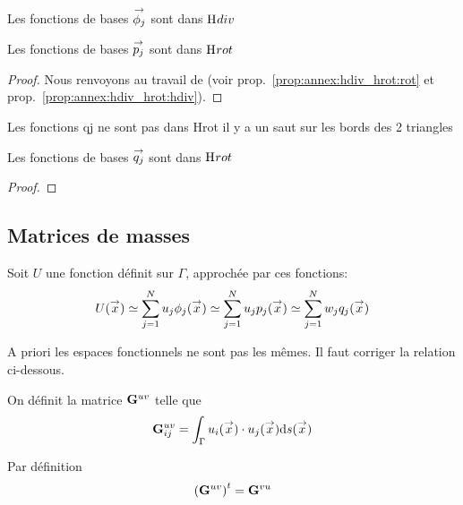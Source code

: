     \begin{prop}
      Les fonctions de bases \({\overset{\rightarrow}{\phi_j}}\) sont dans \(\mathrm{H}_\mathrm{{}}{div}\)
    \end{prop}
    \begin{prop}
      Les fonctions de bases \({\overset{\rightarrow}{p_j}}\) sont dans \(\mathrm{H}_\mathrm{{}}{rot}\)
    \end{prop}
    \begin{proof}
      Nous renvoyons au travail de \cite{nedelec_mixed_1980} (voir prop.~\ref{prop:annex:hdiv_hrot:rot} et prop.~\ref{prop:annex:hdiv_hrot:hdiv}).
    \end{proof}

    \begin{TODO}
      Les fonctions qj ne sont pas dans Hrot il y a un saut sur les bords des 2 triangles
    \end{TODO}
    \begin{prop}
      Les fonctions de bases \({\overset{\rightarrow}{q_j}}\) sont dans \(\mathrm{H}_\mathrm{{}}{rot}\)
    \end{prop}
    \begin{proof}

    \end{proof}


  \subsection{Matrices de masses}
    Soit \(U\) une fonction définit sur \(\Gamma\), approchée par ces fonctions: 
    \[ U({\overset{\rightarrow}{x}}) \simeq \sum\limits_{j=1}^N u_j \phi_j({\overset{\rightarrow}{x}}) \simeq \sum\limits_{j=1}^N u_j p_j({\overset{\rightarrow}{x}}) \simeq \sum\limits_{j=1}^N w_j q_j({\overset{\rightarrow}{x}})
    \]

    \begin{TODO}
      A priori les espaces fonctionnels ne sont pas les mêmes. Il faut corriger la relation ci-dessous.
    \end{TODO}

    \begin{defn}
      On définit la matrice \(\mathbf{G}^{uv}\) telle que
      \begin{equation}
        \mathbf{G}^{uv}_{ij} = \int_\Gamma u_i({\overset{\rightarrow}{x}})\cdot u_j({\overset{\rightarrow}{x}}) \mathrm{d}{s}({\overset{\rightarrow}{x}})
      \end{equation}
    \end{defn}

    \begin{prop}
      Par définition
      \begin{equation}
        \left(\mathbf{G}^{uv}\right)^t = \mathbf{G}^{vu}
      \end{equation}
    \end{prop}

